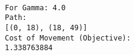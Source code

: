 \documentclass[11pt]{article}
\begin{document}
    \begin{Verbatim}[commandchars=\\\{\}]

For Gamma: 4.0
Path:
[(0, 18), (18, 49)]
Cost of Movement (Objective):
1.338763884

    \end{Verbatim}

    \begin{center}
    \end{center}
    { \hspace*{\fill} \\}
    
    \begin{center}
    \end{center}
    { \hspace*{\fill} \\}
    

    
    
    
    
\end{document}

